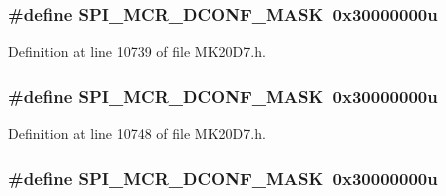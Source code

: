 \subsubsection[{\texorpdfstring{S\+P\+I\+\_\+\+M\+C\+R\+\_\+\+D\+C\+O\+N\+F\+\_\+\+M\+A\+SK}{SPI_MCR_DCONF_MASK}}]{\setlength{\rightskip}{0pt plus 5cm}\#define S\+P\+I\+\_\+\+M\+C\+R\+\_\+\+D\+C\+O\+N\+F\+\_\+\+M\+A\+SK~0x30000000u}\hypertarget{group___s_p_i___register___masks_gab6f80a07ce3be21ee0de56c3de90f380}{}\label{group___s_p_i___register___masks_gab6f80a07ce3be21ee0de56c3de90f380}


Definition at line 10739 of file M\+K20\+D7.\+h.

\subsubsection[{\texorpdfstring{S\+P\+I\+\_\+\+M\+C\+R\+\_\+\+D\+C\+O\+N\+F\+\_\+\+M\+A\+SK}{SPI_MCR_DCONF_MASK}}]{\setlength{\rightskip}{0pt plus 5cm}\#define S\+P\+I\+\_\+\+M\+C\+R\+\_\+\+D\+C\+O\+N\+F\+\_\+\+M\+A\+SK~0x30000000u}\hypertarget{group___s_p_i___register___masks_gab6f80a07ce3be21ee0de56c3de90f380}{}\label{group___s_p_i___register___masks_gab6f80a07ce3be21ee0de56c3de90f380}


Definition at line 10748 of file M\+K20\+D7.\+h.

\subsubsection[{\texorpdfstring{S\+P\+I\+\_\+\+M\+C\+R\+\_\+\+D\+C\+O\+N\+F\+\_\+\+M\+A\+SK}{SPI_MCR_DCONF_MASK}}]{\setlength{\rightskip}{0pt plus 5cm}\#define S\+P\+I\+\_\+\+M\+C\+R\+\_\+\+D\+C\+O\+N\+F\+\_\+\+M\+A\+SK~0x30000000u}\hypertarget{group___s_p_i___register___masks_gab6f80a07ce3be21ee0de56c3de90f380}{}\label{group___s_p_i___register___masks_gab6f80a07ce3be21ee0de56c3de90f380}



